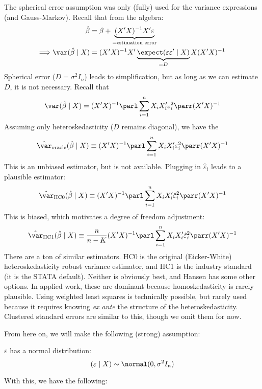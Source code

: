\documentclass[10pt]{article}
\begin{document}
	\begin{remark}
		The spherical error assumption was only (fully) used for the variance expressions (and Gauss-Markov). Recall that from the algebra: \begin{align*} \hat{\beta} &= \beta + \underbrace{(X'X)^{-1}X'\varepsilon}_{=\text{estimation error}} \\ \Longrightarrow \var(\hat{\beta} \mid X) &= (X'X)^{-1}X' \underbrace{\expect (\varepsilon \varepsilon' \mid X)}_{=D}X(X'X)^{-1}\end{align*}Spherical error ($D = \sigma^2 I_n$) leads to simplification, but as long as we can estimate $D$, it is not necessary. Recall that \[\var(\hat{\beta} \mid X) = (X'X)^{-1}\parl \sum_{i=1}^n X_iX_i'\varepsilon_i^2\parr (X'X)^{-1}\]Assuming only heteroskedasticity (\ie $D$ remains diagonal), we have the  \[\hat{\var}_{\text{oracle}}(\hat{\beta} \mid X) \equiv (X'X)^{-1} \parl \sum_{i=1}^n X_iX_i'\varepsilon_i^2\parr (X'X)^{-1}\]This is an unbiased estimator, but is not available. Plugging in $\hat{\varepsilon}_i$ leads to a plausible estimator:\[\hat{\var}_{\text{HC0}}(\hat{\beta} \mid X) \equiv (X'X)^{-1} \parl \sum_{i=1}^n X_iX_i'\hat{\varepsilon}_i^2\parr (X'X)^{-1}\]This is biased, which motivates a degree of freedom adjustment:\[\hat{\var}_{\text{HC1}}(\hat{\beta} \mid X) \equiv \frac{n}{n-K}(X'X)^{-1} \parl \sum_{i=1}^n X_iX_i'\hat{\varepsilon}_i^2\parr (X'X)^{-1}\]There are a ton of similar estimators. HC0 is the original (Eicker-White) heteroskedasticity robust variance estimator, and HC1 is the industry standard (\ie it is the STATA default). Neither is obviously best, and Hansen has some other options. In applied work, these are dominant because homoskedasticity is rarely plausible. Using weighted least squares is technically possible, but rarely used because it requires knowing \emph{ex ante} the structure of the heteroskedasticity. Clustered standard errors are similar to this, though we omit them for now.
	\end{remark}
	
	From here on, we will make the following (strong) assumption:
	\begin{assumption}\label{ass:errors_normal}
		$\varepsilon$ has a normal distribution: \[(\varepsilon\mid X) \sim \normal(0,\sigma^2I_n)\]
	\end{assumption}
	
	With this, we have the following:
	
\end{document}
